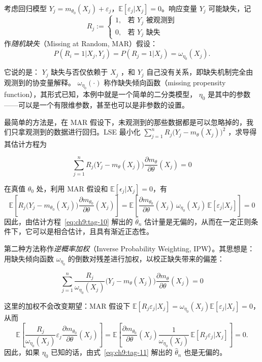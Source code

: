 \begin{example}[缺失响应回归]
考虑回归模型 $Y_j = m_{\theta_0}(X_j) + \varepsilon_j$，$\mathbb{E}[\varepsilon_j|X_j]=0$。响应变量 $Y_j$ 可能缺失，记\[ R_j := \begin{cases} 1, & \text{若 } Y_j \text{ 被观测到}\\ 0, & \text{若 } Y_j \text{ 缺失} \end{cases} \]
作\emph{随机缺失}（Missing at Random, MAR）假设：
\[
P(R_i=1| X_j,Y_j) = P(R_j=1| X_j) = \omega_{\eta_0}(X_j).
\]

它说的是： $Y_j$ 缺失与否仅依赖于 $X_j$ ，和 $Y_j$ 自己没有关系，即缺失机制完全由观测到的协变量解释。 $\omega_{\eta_0}(\cdot)$ 称作缺失倾向函数（missing propensity function），其形式已知，本例中就是一个简单的二分类模型， $\eta_0$ 是其中的参数------可以是一个有限维参数，甚至也可以是非参数的设置。

最简单的方法是，在 MAR 假设下，未观测到的那些数据都是可以忽略掉的，我们只拿观测到的数据进行回归。LSE 最小化 $\sum_{j=1}^n R_j \bigl(Y_j - m_\theta(X_j)\bigr)^2$ ，求导得其估计方程为

\begin{equation}
\label{eq:ch9:tag-10}
\sum_{j=1}^n R_j \bigl(Y_j - m_\theta(X_j)\bigr) \frac{\partial m_\theta}{\partial\theta}(X_j) = 0
\end{equation}

在真值 $\theta_0$ 处，利用 MAR 假设和 $\mathbb{E}[\epsilon_j | X_j] = 0$，有\[\mathbb{E}\left[ R_j \bigl(Y_j - m_{\theta_0}(X_j)\bigr) \frac{\partial m_{\theta_0}}{\partial\theta}(X_j) \right] = \mathbb{E}\left[ \frac{\partial m_{\theta_0}}{\partial\theta}(X_j) \,\omega_{\eta_0}(X_j) \,\mathbb{E}[\varepsilon_j | X_j] \right] = 0\]
因此，由估计方程~\eqref{eq:ch9:tag-10} 解出的 $\widehat\theta_n$ 估计量是无偏的，从而在一定正则条件下，它可以是相合估计，且具有渐近正态性。

第二种方法称作\emph{逆概率加权}（Inverse Probability Weighting, IPW）。其思想是：用缺失倾向函数 $\omega_{\eta_0}$ 的倒数对残差进行加权，以校正缺失带来的偏差：

\begin{equation}
\label{eq:ch9:tag-11}
\sum_{j=1}^n \frac{R_j}{\omega_{\eta_0}(X_j)} \bigl(Y_j - m_\theta(X_j)\bigr) \frac{\partial m_\theta}{\partial\theta}(X_j) = 0
\end{equation}

这里的加权不会改变期望：MAR 假设下 $\mathbb{E}[R_j \varepsilon_j | X_j] = \omega_{\eta_0}(X_j) \mathbb{E}[\varepsilon_j |X_j] = 0$，从而\[\mathbb{E}\left[ \frac{R_j}{\omega_{\eta_0}(X_j)} \varepsilon_j \frac{\partial m_{\theta_0}}{\partial\theta}(X_j) \right] = \mathbb{E}\left[ \frac{\partial m_{\theta_0}}{\partial\theta}(X_j) \frac{1}{\omega_{\eta_0}(X_j)} \,\mathbb{E}[R_j \varepsilon_j | X_j] \right]=0.\]
因此，如果 $\eta_0$ 已知的话，由式~\eqref{eq:ch9:tag-11} 解出的 $\widehat\theta_n$ 也是无偏的。


\end{example}
